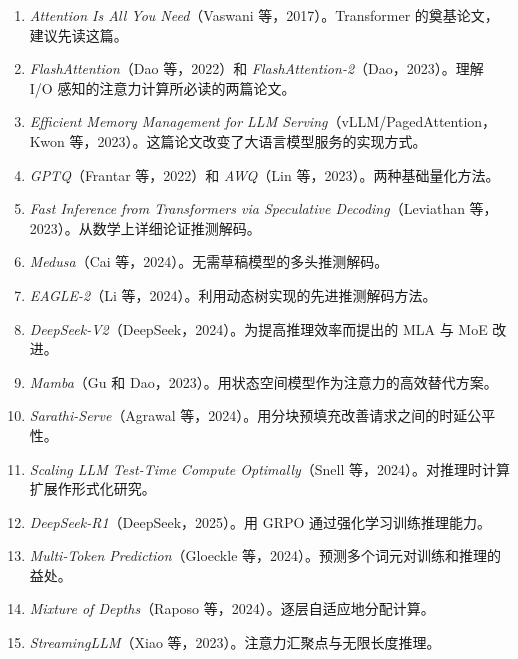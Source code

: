 
\begin{enumerate}[widest=15]
  \item \textit{Attention Is All You Need}（Vaswani 等，2017）。Transformer 的奠基论文，建议先读这篇。
  \item \textit{FlashAttention}（Dao 等，2022）和 \textit{FlashAttention-2}（Dao，2023）。理解 I/O 感知的注意力计算所必读的两篇论文。
  \item \textit{Efficient Memory Management for LLM Serving}（vLLM/PagedAttention，Kwon 等，2023）。这篇论文改变了大语言模型服务的实现方式。
  \item \textit{GPTQ}（Frantar 等，2022）和 \textit{AWQ}（Lin 等，2023）。两种基础量化方法。
  \item \textit{Fast Inference from Transformers via Speculative Decoding}（Leviathan 等，2023）。从数学上详细论证推测解码。
  \item \textit{Medusa}（Cai 等，2024）。无需草稿模型的多头推测解码。
  \item \textit{EAGLE-2}（Li 等，2024）。利用动态树实现的先进推测解码方法。
  \item \textit{DeepSeek-V2}（DeepSeek，2024）。为提高推理效率而提出的 MLA 与 MoE 改进。
  \item \textit{Mamba}（Gu 和 Dao，2023）。用状态空间模型作为注意力的高效替代方案。
  \item \textit{Sarathi-Serve}（Agrawal 等，2024）。用分块预填充改善请求之间的时延公平性。
  \item \textit{Scaling LLM Test-Time Compute Optimally}（Snell 等，2024）。对推理时计算扩展作形式化研究。
  \item \textit{DeepSeek-R1}（DeepSeek，2025）。用 GRPO 通过强化学习训练推理能力。
  \item \textit{Multi-Token Prediction}（Gloeckle 等，2024）。预测多个词元对训练和推理的益处。
  \item \textit{Mixture of Depths}（Raposo 等，2024）。逐层自适应地分配计算。
  \item \textit{StreamingLLM}（Xiao 等，2023）。注意力汇聚点与无限长度推理。
\end{enumerate}
